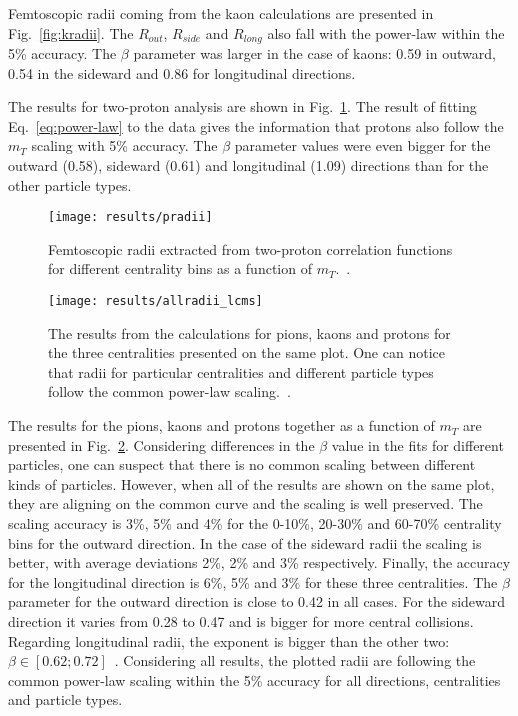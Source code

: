       Femtoscopic radii coming from the kaon calculations are presented in Fig.~\ref{fig:kradii}.
      The $R_{out}$, $R_{side}$ and $R_{long}$ also fall with the power-law within the 5\% accuracy.
      The $\beta$ parameter was larger in the case of kaons: 0.59 in outward, 0.54 in the sideward and 0.86 for longitudinal directions.

      The results for two-proton analysis are shown in Fig.~\ref{fig:pradii}.
      The result of fitting Eq.~\ref{eq:power-law} to the data gives the information that protons also follow the $m_T$ scaling with 5\% accuracy.
      The $\beta$ parameter values were even bigger for the outward (0.58), sideward (0.61) and longitudinal (1.09) directions than for the other particle types. 

      \begin{figure}[b]
        \centering
        \centerline{\texttt{[image: results/pradii]}}
        \caption{Femtoscopic radii extracted from two-proton correlation functions for different centrality bins as a function of $m_T$.~\cite{galazyn}.}
      \label{fig:pradii}
      \end{figure}

      \begin{figure}[b]
        \centering
        \centerline{\texttt{[image: results/allradii\_lcms]}}
        \caption{The results from the calculations for pions, kaons and protons for the three centralities presented on the same plot. One can notice that radii for particular centralities and different particle types follow the common power-law scaling.~\cite{galazyn}.}
      \label{fig:allradii}
      \end{figure}    

      The results for the pions, kaons and protons together as a function of $m_T$ are presented in Fig.~\ref{fig:allradii}.
      Considering differences in the $\beta$ value in the fits for different particles, one can suspect that there is no common scaling between different kinds of particles.
      However, when all of the results are shown on the same plot, they are aligning on the common curve and the scaling is well preserved.
      The scaling accuracy is 3\%, 5\% and 4\% for the 0-10\%, 20-30\% and 60-70\% centrality bins for the outward direction.
      In the case of the sideward radii the scaling is better, with average deviations 2\%, 2\% and 3\% respectively.
      Finally, the accuracy for the longitudinal direction is 6\%, 5\% and 3\% for these three centralities.
      The $\beta$ parameter for the outward direction is close to 0.42 in all cases.
      For the sideward direction it varies from 0.28 to 0.47 and is bigger for more central collisions.
      Regarding longitudinal radii, the exponent is bigger than the other two: $\beta \in [0.62 ; 0.72]$~.
      Considering all results, the plotted radii are following the common power-law scaling within the 5\% accuracy for all directions, centralities and particle types.
      \FloatBarrier
